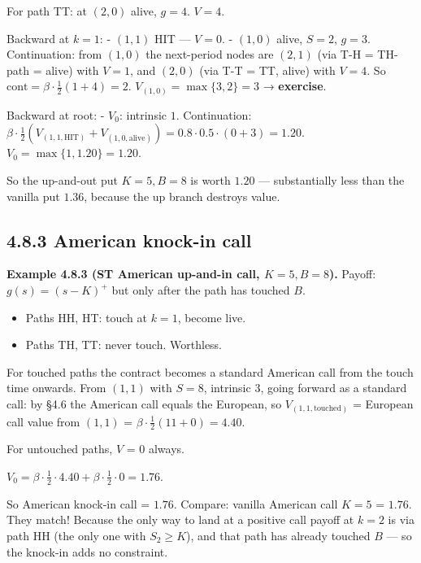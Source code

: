 \documentclass[
  10pt,
  twoside]{book}
\providecommand{\tightlist}{%
  \setlength{\itemsep}{0pt}\setlength{\parskip}{0pt}}
\begin{document}
For path TT: at \((2, 0)\) alive, \(g = 4\). \(V = 4\).

Backward at \(k = 1\): - \((1, 1)\) HIT --- \(V = 0\). - \((1, 0)\)
alive, \(S = 2\), \(g = 3\). Continuation: from \((1, 0)\) the
next-period nodes are \((2, 1)\) (via T-H = TH-path = alive) with
\(V = 1\), and \((2, 0)\) (via T-T = TT, alive) with \(V = 4\). So
\(\text{cont} = \beta\cdot\tfrac{1}{2}(1 + 4) = 2\).
\(V_{(1, 0)} = \max\{3, 2\} = 3\) → \textbf{exercise}.

Backward at root: - \(V_0\): intrinsic \(1\). Continuation:
\(\beta\cdot\tfrac{1}{2}(V_{(1,1, \text{HIT})} + V_{(1, 0, \text{alive})}) = 0.8\cdot 0.5\cdot(0 + 3) = 1.20\).
\(V_0 = \max\{1, 1.20\} = 1.20\).

So the up-and-out put \(K=5, B=8\) is worth \(1.20\) --- substantially
less than the vanilla put \(1.36\), because the up branch destroys
value.

\subsection{4.8.3 American knock-in call}\label{american-knock-in-call}

\textbf{Example 4.8.3 (ST American up-and-in call, \(K = 5, B = 8\)).}
Payoff: \(g(s) = (s - K)^+\) but only after the path has touched \(B\).

\begin{itemize}
\tightlist
\item
  Paths HH, HT: touch at \(k = 1\), become live.
\item
  Paths TH, TT: never touch. Worthless.
\end{itemize}

For touched paths the contract becomes a standard American call from the
touch time onwards. From \((1, 1)\) with \(S = 8\), intrinsic \(3\),
going forward as a standard call: by §4.6 the American call equals the
European, so \(V_{(1, 1, \text{touched})}\) = European call value from
\((1, 1)\) = \(\beta\cdot\tfrac{1}{2}(11 + 0) = 4.40\).

For untouched paths, \(V\) = 0 always.

\(V_0 = \beta\cdot\tfrac{1}{2}\cdot 4.40 + \beta\cdot\tfrac{1}{2}\cdot 0 = 1.76\).

So American knock-in call = \(1.76\). Compare: vanilla American call
\(K=5\) = \(1.76\). They match! Because the only way to land at a
positive call payoff at \(k=2\) is via path HH (the only one with
\(S_2 \ge K\)), and that path has already touched \(B\) --- so the
knock-in adds no constraint.
\end{document}
